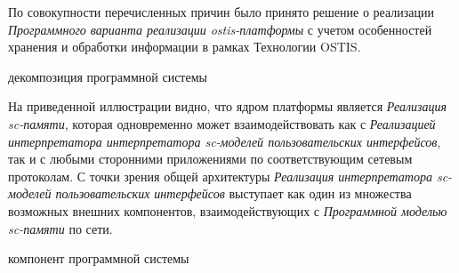 По совокупности перечисленных причин было принято решение о реализации \textit{Программного варианта реализации
ostis-платформы}  с учетом особенностей хранения и обработки информации в рамках
Технологии OSTIS.


\begin{SCn}
\begin{scnrelfromset}{декомпозиция программной системы}
\end{scnrelfromset}
\end{SCn}


На приведенной иллюстрации видно, что ядром платформы является \textit{Реализация sc-памяти},
которая одновременно может взаимодействовать как с \textit{Реализацией интерпретатора интерпретатора sc-моделей
пользовательских интерфейсов}, так и с любыми сторонними приложениями по соответствующим сетевым протоколам.
С точки зрения общей архитектуры \textit{Реализация интерпретатора sc-моделей пользовательских интерфейсов} выступает
как один из множества возможных внешних компонентов, взаимодействующих с \textit{Программной моделью sc-памяти} по сети.


\begin{SCn}
\begin{scnrelfromlist}{компонент программной системы}
\end{scnrelfromlist}
\end{SCn}

